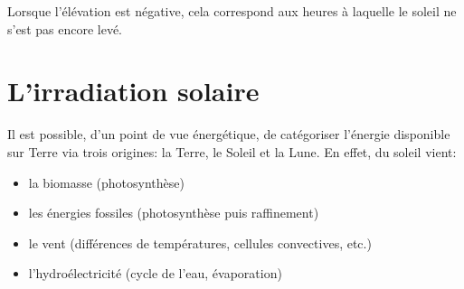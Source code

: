 \documentclass[letterpaper,10pt,english]{sphinxmanual}
\begin{document}
\begin{sphinxVerbatim}[commandchars=\\\{\}]
   
                  
\end{sphinxVerbatim}

\noindent{}

Lorsque l’élévation est négative, cela correspond aux heures à laquelle le soleil ne s’est pas encore levé.


\chapter{L’irradiation solaire}
\label{\detokenize{Part3/Irradiation:l-irradiation-solaire}}\label{\detokenize{Part3/Irradiation::doc}}
Il est possible, d’un point de vue énergétique, de catégoriser l’énergie disponible sur Terre via trois origines: la Terre, le Soleil et la Lune. En effet, du soleil vient:
\begin{itemize}
\item {} 
la biomasse (photosynthèse)

\item {} 
les énergies fossiles (photosynthèse puis raffinement)

\item {} 
le vent (différences de températures, cellules convectives, etc.)

\item {} 
l’hydroélectricité (cycle de l’eau, évaporation)

\end{itemize}
\end{document}
